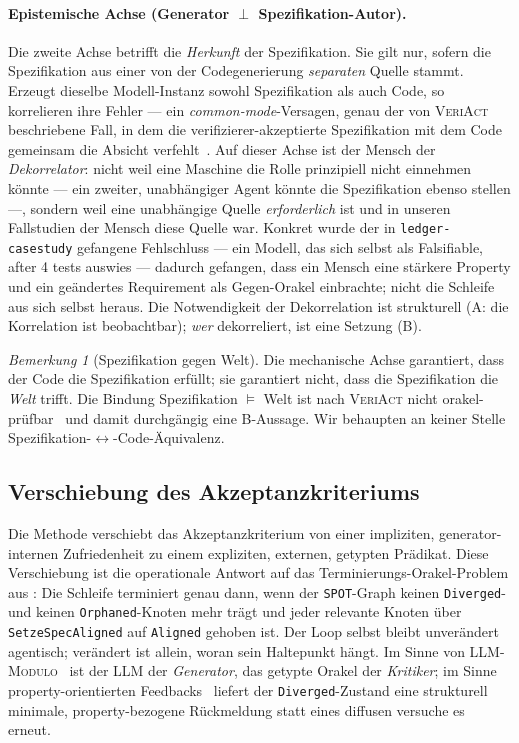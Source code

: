 \documentclass[11pt,a4paper]{article}
\theoremstyle{definition}
\theoremstyle{remark}
\newtheorem{bemerkung}{Bemerkung}[section]
\begin{document}
\paragraph{Epistemische Achse (Generator $\perp$ Spezifikation-Autor).}
Die zweite Achse betrifft die \emph{Herkunft} der Spezifikation. Sie gilt nur, sofern die
Spezifikation aus einer von der Codegenerierung \emph{separaten} Quelle stammt. Erzeugt
dieselbe Modell-Instanz sowohl Spezifikation als auch Code, so korrelieren ihre Fehler ---
ein \emph{common-mode}-Versagen, genau der von \textsc{VeriAct} beschriebene Fall, in dem die
verifizierer-akzeptierte Spezifikation mit dem Code gemeinsam die Absicht
verfehlt~\cite{veriact2026}. Auf dieser Achse ist der Mensch der \emph{Dekorrelator}: nicht
weil eine Maschine die Rolle prinzipiell nicht einnehmen könnte --- ein zweiter, unabhängiger
Agent könnte die Spezifikation ebenso stellen ---, sondern weil eine unabhängige Quelle
\emph{erforderlich} ist und in unseren Fallstudien der Mensch diese Quelle war. Konkret wurde
der in \texttt{ledger-casestudy} gefangene Fehlschluss --- ein Modell, das sich selbst als
\glqq Falsifiable, after 4 tests\grqq{} auswies --- dadurch gefangen, dass ein Mensch eine stärkere
Property und ein geändertes Requirement als Gegen-Orakel einbrachte; nicht die Schleife aus
sich selbst heraus. Die Notwendigkeit der Dekorrelation ist strukturell (A: die Korrelation ist
beobachtbar); \emph{wer} dekorreliert, ist eine Setzung (B).

\begin{bemerkung}[Spezifikation gegen Welt]
\label{bem:spec-welt}
Die mechanische Achse garantiert, dass der Code die Spezifikation erfüllt; sie garantiert
nicht, dass die Spezifikation die \emph{Welt} trifft. Die Bindung \glqq Spezifikation $\models$
Welt\grqq{} ist nach \textsc{VeriAct} nicht orakel-prüfbar~\cite{veriact2026} und damit
durchgängig eine B-Aussage. Wir behaupten an keiner Stelle Spezifikation-$\leftrightarrow$-Code-Äquivalenz.
\end{bemerkung}

\subsection{Verschiebung des Akzeptanzkriteriums}
\label{sec:akzeptanz}

Die Methode verschiebt das Akzeptanzkriterium von einer impliziten, generator-internen
Zufriedenheit zu einem expliziten, externen, getypten Prädikat. Diese Verschiebung ist die
operationale Antwort auf das Terminierungs-Orakel-Problem aus : Die
Schleife terminiert genau dann, wenn der \texttt{SPOT}-Graph keinen \texttt{Diverged}- und
keinen \texttt{Orphaned}-Knoten mehr trägt und jeder relevante Knoten über
\texttt{SetzeSpecAligned} auf \texttt{Aligned} gehoben ist. Der Loop selbst bleibt unverändert
agentisch; verändert ist allein, woran sein Haltepunkt hängt. Im Sinne von
\textsc{LLM-Modulo}~\cite{kambhampati2024} ist der LLM der \emph{Generator}, das getypte
Orakel der \emph{Kritiker}; im Sinne property-orientierten Feedbacks~\cite{pgs2025} liefert der
\texttt{Diverged}-Zustand eine strukturell minimale, property-bezogene Rückmeldung statt eines
diffusen \glqq versuche es erneut\grqq.
\end{document}
